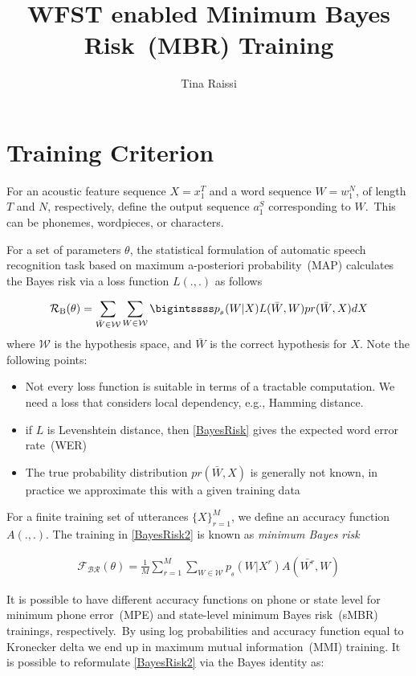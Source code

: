 \documentclass[a4paper,13.5pt]{extarticle}
\title{WFST enabled Minimum Bayes Risk~(MBR) Training}
\author{Tina Raissi}
\begin{document}
	
	\maketitle
	
	\section{Training Criterion}
	For an acoustic feature sequence $X = x_1^T$ and a word sequence $W = w_1^N$, of length $T$ and $N$, respectively, define the output sequence $a_1^S$ corresponding to $W$.\  This can be phonemes, wordpieces, or characters.
	
	For a set of parameters $\theta$, the statistical formulation of automatic speech recognition task based on maximum a-posteriori probability~(MAP) calculates the Bayes risk via a loss function $L(.,.)$ as follows 
	
	\begin{align}
		\label{BayesRisk}
		\mathcal{R_{\text{B}}}(\theta) = \sum_{\bar{W} \in \mathcal{W}} \sum_{W\in \mathcal{W}} \bigintssss p_{_\theta}(W | X) L(\bar{W}, W)  pr(\bar{W} , X)dX
	\end{align}
	where $\mathcal{W}$ is the hypothesis space, and $\bar{W}$ is the correct hypothesis for $X$.  Note the following points:
	
	\begin{itemize}
		\item Not every loss function is suitable in terms of a tractable computation. We need a loss that considers local dependency, e.g., Hamming distance.
		\item if $L$ is Levenshtein distance, then \cref{BayesRisk} gives the expected word error rate~(WER)
		\item The true probability distribution $ pr(\bar{W} , X)$ is generally not known, in practice we approximate this with a given training data
	\end{itemize}
	
	For a finite training set of utterances $\{X\}_{r=1}^M$, we define an accuracy function $A(.,.)$. The training in \cref{BayesRisk2} is known as \textit{minimum Bayes risk}\cite{gibson2006hypothesis}
	
	\begin{align}
		\label{BayesRisk2}
		\mathcal{F_{\text{BR}}}(\theta) = \frac{1}{M}\sum_{r=1}^M\sum_{W \in \mathcal{W}} p_{_\theta}(W | X^r) A(\bar{W^r}, W)
	\end{align}
	
	
	It is possible to have different accuracy functions on phone or state level for minimum phone error~(MPE)\cite{povey2002minimum} and state-level minimum Bayes risk~(sMBR) trainings, respectively.\ By using log probabilities and accuracy function equal to Kronecker delta we end up in maximum mutual information~(MMI) training.
	It is possible to reformulate \cref{BayesRisk2} via the Bayes identity as: 
	
\end{document}

